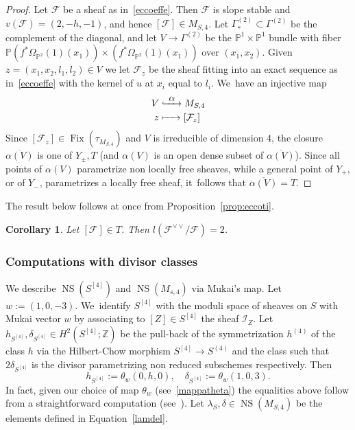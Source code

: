\documentclass[11pt]{article}
\newcommand\To[1]{\mathchoice{\xrightarrow{\textstyle\kern4pt#1\kern3pt}}{\stackrel{#1}{\longrightarrow}}{}{}}
\newcommand\Hto[1]{\mathrel{\lhook\joinrel\To{#1}}}
\newcommand\Mto[1]{\mathrel{\mapstochar\To{#1}}}
\newcommand{\PP}{{\mathbb P}}\let\P\PP
\newcommand{\ZZ}{{\mathbb Z}}\let\Z\ZZ
\newcommand\cF{\mathcal{F}}
\newcommand\cI{\mathcal{I}}
\DeclareMathOperator{\Fix}{Fix}
\DeclareMathOperator{\NS}{NS}
\let\ov\overline
\newtheorem{coro}[lemm]{Corollary}
\theoremstyle{definition}
\begin{document}
\begin{proof}
Let $\cF$ be a sheaf as in~\eqref{eccoeffe}. Then $\cF$ is slope stable and $v(\cF)=(2,-h,-1)$, and hence $[\cF]\in M_{S,4}$. Let ${\mathsf\Gamma}^{(2)}_{*}\subset {\mathsf\Gamma}^{(2)}$ be the complement of the diagonal, and
let $V\to{\mathsf\Gamma}^{(2)}$ be the $\PP^1\times\PP^1$ bundle with fiber $\PP(f^*\Omega_{\P^2}(1)(x_1))\times(f^*\Omega_{\P^2}(1)(x_1))$ over $(x_1,x_2)$.
Given $z=(x_1,x_2,l_1,l_2)\in V$ we let $\cF_z$ be the sheaf fitting into an exact sequence as in~\eqref{eccoeffe} with the kernel of $u$ at $x_i$ equal to $l_i$. We~have an injective map
\begin{equation*}
\begin{aligned}
V & \Hto{\alpha} M_{S,4} \\
z & \Mto{\hphantom{\alpha}} [\cF_z]
\end{aligned}
\end{equation*}
Since $[\cF_z]\in\Fix(\tau_{M_{S,4}})$ and $V$ is irreducible of dimension $4$, the closure $\ov{\alpha(V)}$ is one of $Y_{\pm},T$ (and $\alpha(V)$ is an open dense subset of $\ov{\alpha(V)}$). Since all points of $\alpha(V)$ parametrize non locally free sheaves, while a general point of $Y_{+}$, or of $Y_{-}$, parametrizes a locally free sheaf, it~follows that $\ov{\alpha(V)}=T$.
\end{proof}

The result below follows at once from Proposition~\ref{prop:eccoti}.

\begin{coro}\label{coro:eccoti}
Let $[\cF]\in T$. Then $l(\cF^{\vee\vee}/\cF)=2$.
\end{coro}

\subsubsection*{Computations with divisor classes}
We describe $\NS(S^{[4]})$ and $\NS(M_{s,4})$ via Mukai's map.
Let $w:=(1,0,-3)$. We~identify $S^{[4]}$ with the moduli space of sheaves on $S$ with Mukai vector $w$ by associating to $[Z]\in S^{[4]}$ the sheaf $\cI_Z$.
Let $h_{S^{[4]}},\delta_{S^{[4]}}\in H^2(S^{[4]};\ZZ)$ be the pull-back of the symmetrization $h^{(4)}$ of the class $h$ via the
Hilbert-Chow morphism $S^{[4]}\to S^{(4)}$ and the class such that $2\delta_{S^{[4]}}$ is the divisor parametrizing non reduced subschemes respectively. Then
\begin{equation*}
h_{S^{[4]}}:=\theta_w(0,h,0),\quad \delta_{S^{[4]}}:=\theta_w(1,0,3).
\end{equation*}
In fact, given our choice of map $\theta_w$ (see~\ref{mappatheta}) the equalities above follow from a straightforward computation (see~\cite[p.\,630]{Kieran:weight2}).
Let $\lambda_S,\delta\in \NS(M_{S,4})$ be the elements defined in Equation~\eqref{lamdel}.
\end{document}
